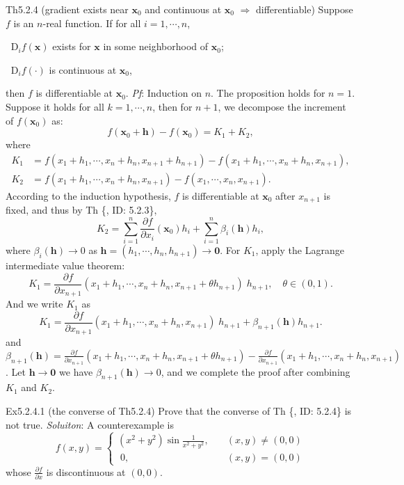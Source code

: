 \documentclass{article}
\newcommand{\parfrac}[2]{\frac{\partial #1}{\partial #2}}
\newcommand{\Dif}{\mathop{}\!\mathrm{D}}
\begin{document}
\begin{Th}{Th5.2.4 (gradient exists near $\pmb{x}_0$ and continuous at $\pmb{x}_0$ $\Rightarrow$ differentiable)}
    Suppose $f$ is an $n$-real function. If for all $i=1,\cdots,n$, 
    \begin{compactenum}
        \item $\Dif_i f(\pmb{x})$ exists for $\pmb{x}$ in some neighborhood of $\pmb{x}_0$;
        \item $\Dif_i f(\cdot)$ is continuous at $\pmb{x}_0$,
    \end{compactenum}
    then $f$ is differentiable at $\pmb{x}_0$.
    \tcblower
    \textit{Pf}: Induction on $n$. The proposition holds for $n=1$. Suppose it holds for all $k=1,\cdots, n$, then for $n+1$, we decompose the increment of $f(\pmb{x}_0)$ as:
    $$ f(\pmb{x}_0 + \pmb{h}) - f(\pmb{x}_0) = K_1 + K_2, $$
    where
    $$
    \begin{aligned}
    K_1 &= f(x_1+h_1, \cdots, x_n+h_n, x_{n+1} + h_{n+1}) - f(x_1+h_1, \cdots, x_n+h_n, x_{n+1}),\\
    K_2 &= f(x_1+h_1, \cdots, x_n+h_n, x_{n+1}) - f(x_1, \cdots, x_n, x_{n+1}).
    \end{aligned}
    $$
    According to the induction hypothesis, $f$ is differentiable at $\pmb{x}_0$ after $x_{n+1}$ is fixed, and thus by Th \{, ID: 5.2.3\}, 
    $$ K_2 = \sum_{i=1}^{n} \parfrac{f}{x_i}(\pmb{x}_0)h_i + \sum_{i=1}^{n} \beta_i (\pmb{h}) h_i, $$
    where $\beta_i(\pmb{h})\rightarrow 0$ as $\pmb{h} = (h_1, \cdots, h_n, h_{n+1})\rightarrow \pmb{0}$.
    For $K_1$, apply the Lagrange intermediate value theorem:
    $$ K_1 = \parfrac{f}{x_{n+1}}(x_1+h_1, \cdots, x_n+h_n, x_{n+1}+\theta h_{n+1})\;h_{n+1},\quad\theta\in (0,1).$$
    And we write $K_1$ as
    $$ K_1 = \parfrac{f}{x_{n+1}}(x_1+h_1, \cdots, x_n+h_n, x_{n+1})\;h_{n+1} + \beta_{n+1}(\pmb{h}) h_{n+1}. $$
    and 
    $\beta_{n+1}(\pmb{h}) = \parfrac{f}{x_{n+1}}(x_1+h_1, \cdots, x_n+h_n, x_{n+1}+\theta h_{n+1}) - \parfrac{f}{x_{n+1}}(x_1+h_1, \cdots, x_n+h_n, x_{n+1})$.
    Let $\pmb{h}\rightarrow \pmb{0}$ we have $\beta_{n+1}(\pmb{h})\rightarrow 0$, and we complete the proof after combining $K_1$ and $K_2$.
\end{Th}

\begin{Th}{Ex5.2.4.1 (the converse of Th5.2.4)}
    Prove that the converse of Th \{, ID: 5.2.4\} is not true.
    \tcblower
    \textit{Soluiton}: A counterexample is
    $$ f(x,y) = \begin{cases}
        (x^2+y^2)\sin\frac{1}{x^2+y^2},\quad &(x,y)\neq (0,0)\\
        \;0, \quad &(x,y) = (0,0)
    \end{cases}
    $$
    whose $\parfrac{f}{x}$ is discontinuous at $(0,0)$.
\end{Th}
\end{document}
